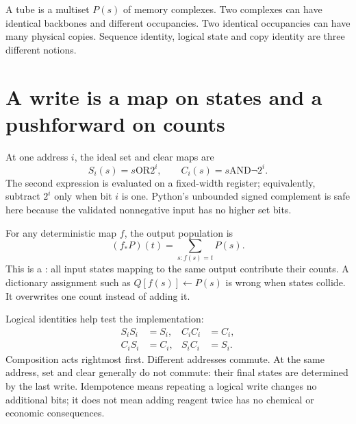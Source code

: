 A tube is a multiset $P(s)$ of memory complexes. Two complexes can have
identical backbones and different occupancies. Two identical occupancies
can have many physical copies. Sequence identity, logical state and copy
identity are three different notions.

\section{A write is a map on states and a pushforward on counts}
At one address $i$, the ideal set and clear maps are
\begin{equation}
 S_i(s)=s\mathbin{\mathrm{OR}}2^i,\qquad
 C_i(s)=s\mathbin{\mathrm{AND}}\neg 2^i.
 \label{eq:write}
\end{equation}
The second expression is evaluated on a fixed-width register; equivalently,
subtract $2^i$ only when bit $i$ is one. Python's unbounded signed complement
is safe here because the validated nonnegative input has no higher set bits.

For any deterministic map $f$, the output population is
\begin{equation}
 (f_*P)(t)=\sum_{s:f(s)=t}P(s).
 \label{eq:pushforward}
\end{equation}
This is a : all input states mapping to the same output
contribute their counts. A dictionary assignment such as
$Q[f(s)]\leftarrow P(s)$ is wrong when states collide. It overwrites one
count instead of adding it.


Logical identities help test the implementation:
\begin{align}
 S_iS_i&=S_i,& C_iC_i&=C_i,\\
 C_iS_i&=C_i,& S_iC_i&=S_i.
 \label{eq:algebra}
\end{align}
Composition acts rightmost first. Different addresses commute. At the
same address, set and clear generally do not commute: their final states
are determined by the last write. Idempotence means repeating a logical
write changes no additional bits; it does not mean adding reagent twice
has no chemical or economic consequences.


